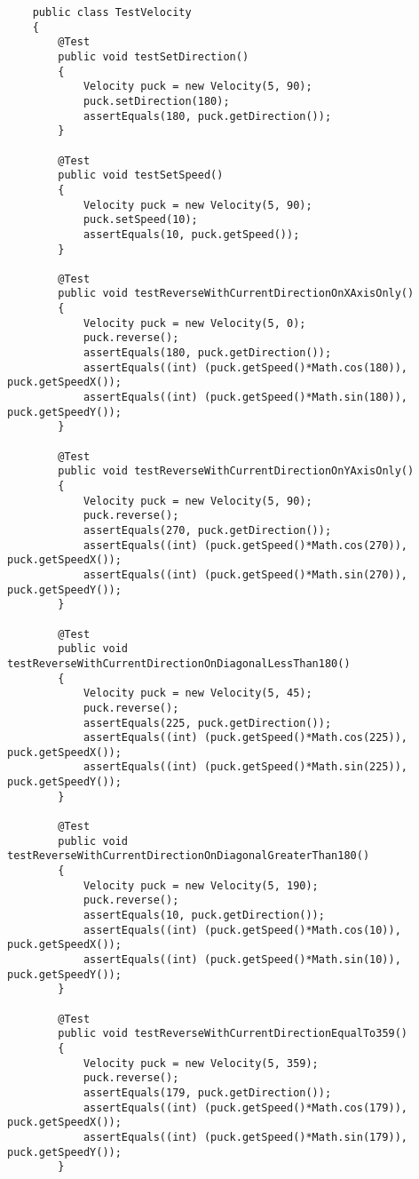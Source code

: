 \documentclass{article}
\begin{document}
\begin{lstlisting}
    public class TestVelocity
    {
        @Test
        public void testSetDirection()
        {
            Velocity puck = new Velocity(5, 90);
            puck.setDirection(180);
            assertEquals(180, puck.getDirection());
        }

        @Test
        public void testSetSpeed()
        {
            Velocity puck = new Velocity(5, 90);
            puck.setSpeed(10);
            assertEquals(10, puck.getSpeed());
        }

        @Test
        public void testReverseWithCurrentDirectionOnXAxisOnly()
        {
            Velocity puck = new Velocity(5, 0);
            puck.reverse();
            assertEquals(180, puck.getDirection());
            assertEquals((int) (puck.getSpeed()*Math.cos(180)), puck.getSpeedX());
            assertEquals((int) (puck.getSpeed()*Math.sin(180)), puck.getSpeedY());
        }

        @Test
        public void testReverseWithCurrentDirectionOnYAxisOnly()
        {
            Velocity puck = new Velocity(5, 90);
            puck.reverse();
            assertEquals(270, puck.getDirection());
            assertEquals((int) (puck.getSpeed()*Math.cos(270)), puck.getSpeedX());
            assertEquals((int) (puck.getSpeed()*Math.sin(270)), puck.getSpeedY());
        }

        @Test
        public void testReverseWithCurrentDirectionOnDiagonalLessThan180()
        {
            Velocity puck = new Velocity(5, 45);
            puck.reverse();
            assertEquals(225, puck.getDirection());
            assertEquals((int) (puck.getSpeed()*Math.cos(225)), puck.getSpeedX());
            assertEquals((int) (puck.getSpeed()*Math.sin(225)), puck.getSpeedY());
        }

        @Test
        public void testReverseWithCurrentDirectionOnDiagonalGreaterThan180()
        {
            Velocity puck = new Velocity(5, 190);
            puck.reverse();
            assertEquals(10, puck.getDirection());
            assertEquals((int) (puck.getSpeed()*Math.cos(10)), puck.getSpeedX());
            assertEquals((int) (puck.getSpeed()*Math.sin(10)), puck.getSpeedY());
        }

        @Test
        public void testReverseWithCurrentDirectionEqualTo359()
        {
            Velocity puck = new Velocity(5, 359);
            puck.reverse();
            assertEquals(179, puck.getDirection());
            assertEquals((int) (puck.getSpeed()*Math.cos(179)), puck.getSpeedX());
            assertEquals((int) (puck.getSpeed()*Math.sin(179)), puck.getSpeedY());
        }


\end{lstlisting}
\end{document}
